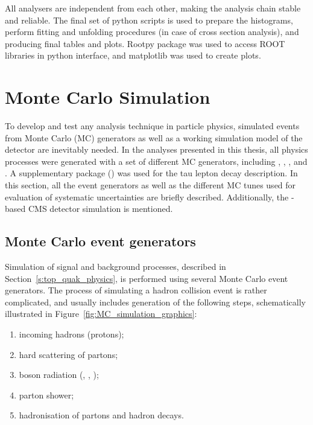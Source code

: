 All analysers are independent from each other, making the analysis chain stable and reliable. The final set of python
scripts is used to prepare the histograms, perform fitting and unfolding procedures (in case of cross section analysis),
and producing final tables and plots. Rootpy package \autocite{rootpy} was used to access ROOT libraries in python
interface, and matplotlib \autocite{matplotlib} was used to create plots.

\section{Monte Carlo Simulation}
\label{s:MC_simulation}

To develop and test any analysis technique in particle physics, simulated events from Monte Carlo (MC) generators as
well as a working simulation model of the detector are inevitably needed. In the analyses presented in this thesis, all
physics processes were generated with a set of different MC generators, including \MADGRAPH \autocite{MadGraph}, \PYTHIA
\autocite{Pythia,Pythia6.4}, \MCATNLO \autocite{MCatNLO}, and \POWHEG \autocite{POWHEG}. A supplementary package
(\TAUOLA \autocite{TAUOLA}) was used for the tau lepton decay description. In this section, all the event generators as
well as the different MC tunes used for evaluation of systematic uncertainties are briefly described. Additionally, the
\GEANTfour-based \autocite{GEANT4} CMS detector simulation is mentioned.

\subsection{Monte Carlo event generators}
\label{ss:MC_generators}
Simulation of \ttbar signal and background processes, described in Section~\ref{s:top_quak_physics}, is performed using
several Monte Carlo event generators. The process of simulating a hadron collision event is rather complicated, and
usually includes generation of the following steps, schematically illustrated in Figure~\ref{fig:MC_simulation_graphics}:

\begin{enumerate}[label=\textbullet]
  \item incoming hadrons (protons);
  \item hard scattering of partons;
  \item boson radiation (\Z, \photon, \cPg);
  \item parton shower;
  \item hadronisation of partons and hadron decays.
\end{enumerate}


